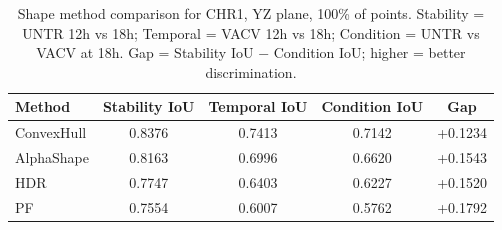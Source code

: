 \begin{table}[ht]
\centering
\small
\caption{Shape method comparison for CHR1, YZ plane, 100\% of points. Stability = UNTR 12h vs 18h; Temporal = VACV 12h vs 18h; Condition = UNTR vs VACV at 18h. Gap = Stability IoU $-$ Condition IoU; higher = better discrimination.}
\label{tab:chr1_yz_100}
\begin{tabular}{lcccc}
\toprule
Method & Stability IoU & Temporal IoU & Condition IoU & Gap \\
\midrule
ConvexHull & 0.8376 & 0.7413 & 0.7142 & +0.1234 \\
AlphaShape & 0.8163 & 0.6996 & 0.6620 & +0.1543 \\
HDR & 0.7747 & 0.6403 & 0.6227 & +0.1520 \\
PF & 0.7554 & 0.6007 & 0.5762 & +0.1792 \\
\bottomrule
\end{tabular}
\end{table}